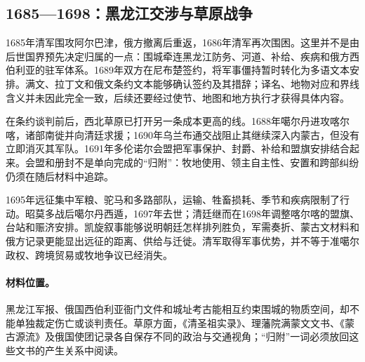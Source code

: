 \subsection{1685—1698：黑龙江交涉与草原战争}

1685年清军围攻阿尔巴津，俄方撤离后重返，1686年清军再次围困。这里并不是由后世国界预先决定归属的一点：围城牵连黑龙江防务、河道、补给、疾病和俄方西伯利亚的驻军体系。1689年双方在尼布楚签约，将军事僵持暂时转化为多语文本安排。满文、拉丁文和俄文条约文本能够确认签约及其措辞；译名、地物对应和界线含义并未因此完全一致，后续还要经过使节、地图和地方执行才获得具体内容。

在条约谈判前后，西北草原已打开另一条成本更高的线。1688年噶尔丹进攻喀尔喀，诸部南徙并向清廷求援；1690年乌兰布通交战阻止其继续深入内蒙古，但没有立即消灭其军队。1691年多伦诺尔会盟把军事保护、封爵、补给和盟旗安排结合起来。会盟和册封不是单向完成的“归附”：牧地使用、领主自主性、安置和跨部纠纷仍须在随后材料中追踪。

1695年远征集中军粮、驼马和多路部队，运输、牲畜损耗、季节和疾病限制了行动。昭莫多战后噶尔丹西遁，1697年去世；清廷继而在1698年调整喀尔喀的盟旗、台站和赈济安排。凯旋叙事能够说明朝廷怎样排列胜负，军需奏折、蒙古文材料和俄方记录更能显出远征的距离、供给与迁徙。清军取得军事优势，并不等于准噶尔政权、跨境贸易或牧地争议已经消失。

\paragraph{材料位置。} 黑龙江军报、俄国西伯利亚衙门文件和城址考古能相互约束围城的物质空间，却不能单独裁定伤亡或谈判责任。草原方面，《清圣祖实录》、理藩院满蒙文文书、《蒙古源流》及俄国使团记录各自保存不同的政治与交通视角；“归附”一词必须放回这些文书的产生关系中阅读。






